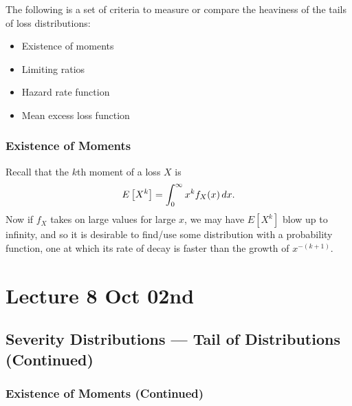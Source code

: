 \documentclass[notoc,notitlepage]{tufte-book}
\begin{document}
The following is a set of criteria to measure or compare the heaviness of the tails of loss distributions:
\begin{itemize}
  \item Existence of moments
  \item Limiting ratios
  \item Hazard rate function
  \item Mean excess loss function
\end{itemize}

\subsection{Existence of Moments}%
\label{sub:existence_of_moments}

Recall that the $k$th moment of a loss $X$ is
\begin{equation*}
  E\left[X^k\right] = \int_{0}^{\infty} x^k f_X(x) \mathop{}\!d{x}.
\end{equation*}
Now if $f_X$ takes on large values for large $x$, we may have $E\left[X^k\right]$ blow up to infinity, and so it is desirable to find/use some distribution with a  probability function, one at which its rate of decay is faster than the growth of $x^{-(k + 1)}$.




\chapter{Lecture 8 Oct 02nd}%
\label{chp:lecture_8_oct_02nd}

\section{Severity Distributions --- Tail of Distributions (Continued)}%
\label{sec:severity_distributions_tail_of_distributions_continued}

\subsection{Existence of Moments (Continued)}%
\label{sub:existence_of_moments_continued}
\end{document}
